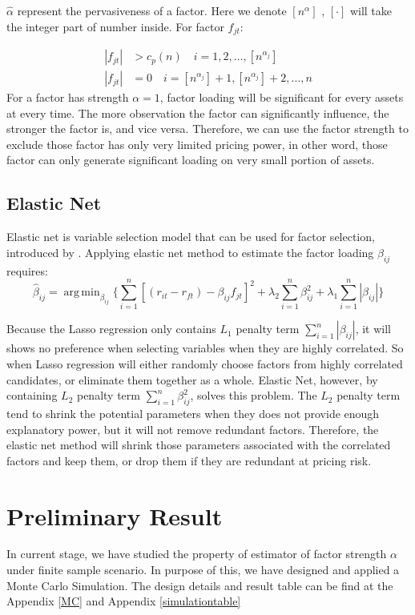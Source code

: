 \documentclass[12pt]{article}
\DeclareMathOperator*{\argmin}{arg\,min}
\begin{document}
$\hat{\alpha}$ represent the pervasiveness of a factor. 
Here we denote $[n^{\alpha}]$ , $[\cdot]$ will take the integer part of number inside. 
For factor $f_{jt}$:

\begin{align*}
|f_{jt}| &> c_p(n)\quad i = 1, 2,  \dots, [n^{\alpha_j}]\\
|f_{jt}| &= 0 \quad i = [n^{\alpha_j}] + 1, [n^{\alpha_j}] +2 ,\dots, n
\end{align*}
For a factor has strength $\alpha = 1$,  factor loading will be significant for every assets at every time. 
The more observation the factor can significantly influence, the stronger the factor is, and vice versa.
Therefore, we can use the factor strength to exclude those factor has only very limited pricing power, in other word, those factor can only generate significant loading on very small portion of assets. 

\subsection{Elastic Net}

Elastic net  is variable selection model that can be used for factor selection, introduced by . Applying elastic net method to estimate the factor loading $\beta_{ij}$ requires:
	\[   \hat{\beta}_{ij}  = \argmin_{\beta_{ij}}\{\sum_{i = 1}^{n}[(r_{it} - r_{ft}) - \beta_{ij }f_{jt}]^2 + \lambda_2\sum_{i = 1}^{n}\beta_{ij}^2  + \lambda_1\sum_{i = 1}^{n}|\beta_{ij}|  \label{ENcriterion} \tag{4}   \}    \]
	
	
	
Because the Lasso regression only contains $L_1$ penalty term $\sum_{i = 1}^{n} |\beta_{ij}|$, it will shows no preference when selecting variables when they are highly correlated.
So when Lasso regression will either randomly choose factors from highly correlated candidates, or eliminate them together as a whole.  
Elastic Net, however, by containing $L_2$ penalty term $\sum_{i=1}^{n}\beta_{ij}^2$, solves this problem. 
The $L_2$ penalty term tend to shrink the potential parameters when they does not provide enough explanatory power, but it will not remove redundant factors.
Therefore, the elastic net method will shrink those parameters associated with the correlated factors and keep them, or drop them if they are redundant at pricing risk. 
	


\section{Preliminary Result}\label{preli}
In current stage, we have studied the property of estimator of factor strength $\alpha$ under finite sample scenario.
In purpose of this, we have designed and applied a Monte Carlo Simulation.
The design details and result table can be find at the Appendix \ref{MC} and Appendix \ref{simulationtable} 
\end{document}
